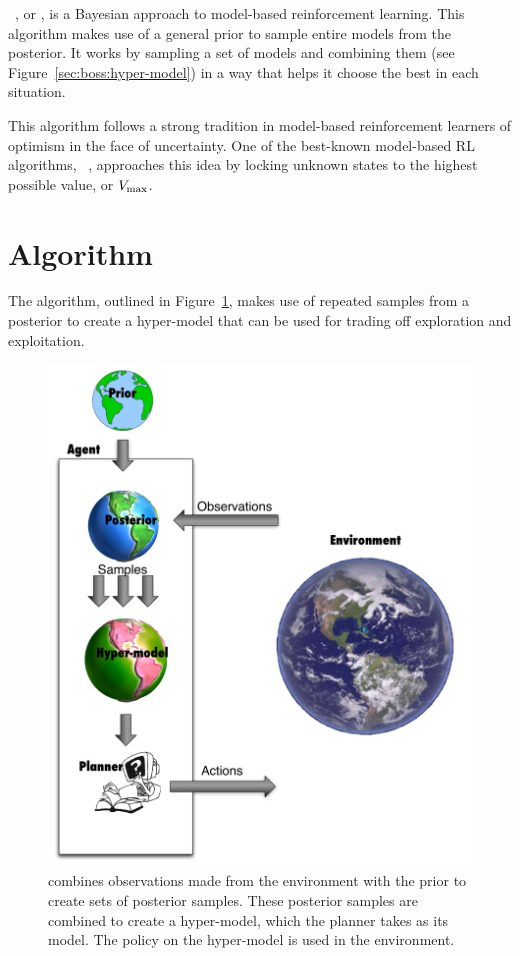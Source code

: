 ~\cite{asmuth09}, or , is a Bayesian approach to model-based reinforcement learning. This algorithm makes use of a general prior to sample entire models from the posterior. It works by sampling a set of models and combining them (see Figure~\ref{sec:boss:hyper-model}) in a way that helps it choose the best in each situation.

This algorithm follows a strong tradition in model-based reinforcement learners of optimism in the face of uncertainty. One of the best-known model-based RL algorithms, ~\cite{brafman03}, approaches this idea by locking unknown states to the highest possible value, or $V_{\rm max}$.

\section{Algorithm}

The  algorithm, outlined in Figure~\ref{boss:fig:boss-general}, makes use of repeated samples from a posterior to create a hyper-model that can be used for trading off exploration and exploitation.


\begin{figure}[t]
\begin{center}
\includegraphics[width=0.75\linewidth]{boss-loop}
\caption{ combines observations made from the environment with the prior to create sets of posterior samples. These posterior samples are combined to create a hyper-model, which the planner takes as its model. The policy on the hyper-model is used in the environment.}
\label{boss:fig:boss-general}
\end{center}
\end{figure}

